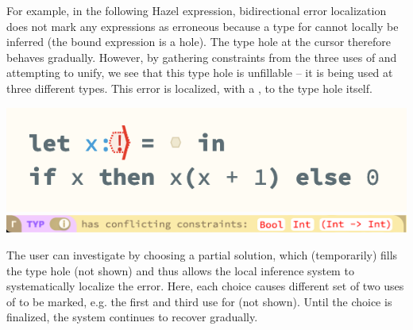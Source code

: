 For example, in the following Hazel expression, bidirectional error localization 
does not mark any expressions as erroneous because a type for  cannot locally be inferred (the bound expression is a hole). The type hole at the cursor therefore behaves gradually. 
However, by gathering constraints from the three uses of  and attempting to unify, we see that this type hole is unfillable -- it is being used at three different types. This error is localized, with a \li{!}, to the type hole itself.
\begin{center}
\vspace{-3px}
    \includegraphics[scale=0.55]{images/intro-thi.png}
    \includegraphics[scale=0.4]{images/example_CI.png}
\end{center}
The user can investigate by choosing a partial solution, which (temporarily) fills the type hole (not shown) and thus allows the local inference system to systematically localize the error.
Here, each choice causes different set of two uses of  to be marked, e.g. the first and third use for  (not shown). Until the choice is finalized, the system continues to recover gradually.
